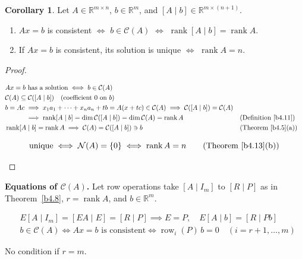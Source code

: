 \documentclass[12pt]{article}
\newcommand{\R}{\mathbb R}
\DeclareMathOperator{\rank}{rank}
\theoremstyle{definition}
\newtheorem{corollary}[theorem]{Corollary}
\newcommand{\boardtop}{\vspace*{-\abovedisplayskip}}
\DeclareMathOperator{\row}{row}
\begin{document}
\begin{corollary}\label{b4.14}
Let \(A\in\R^{m\times n}\), \(b\in\R^m\), and \([A\mid b]\in\R^{m\times(n+1)}\).
\begin{enumerate}
\item \(Ax=b\) is consistent \(\iff\) \(b\in\mathcal C(A)\) \(\iff\) \(\rank[A\mid b]=\rank A\).
\item If \(Ax=b\) is consistent, its solution is unique \(\iff\) \(\rank A=n\).
\end{enumerate}
\end{corollary}
\begin{proof}
\begin{board}[(a) \(Ax=x_1a_1+\dots+x_na_n\) (\lec{1}, \lit{Theorem~4}(b)):]
\boardtop
\begin{align*}
&Ax=b\text{ has a solution}\iff b\in\mathcal C(A)\\
&\mathcal C(A)\subseteq\mathcal C([A\mid b])\quad(\text{coefficient }0\text{ on }b)\\
&b=Ac\implies x_1a_1+\dots+x_na_n+tb=A(x+tc)\in\mathcal C(A)\implies\mathcal C([A\mid b])=\mathcal C(A)\\
&\phantom{b=Ac}\implies\rank[A\mid b]=\dim\mathcal C([A\mid b])=\dim\mathcal C(A)=\rank A&&\text{(Definition~\ref{b4.11})}\\
&\rank[A\mid b]=\rank A\implies\mathcal C(A)=\mathcal C([A\mid b])\ni b&&\text{(Theorem~\ref{b4.5}(a))}
\end{align*}
\end{board}
\begin{board}
\[
\text{unique}\iff\mathcal N(A)=\{0\}\iff\rank A=n\qquad\text{(Theorem~\ref{b4.13}(b))}
\]
\end{board}
\nopagebreak
\end{proof}

\textbf{Equations of \(\mathcal C(A)\).} Let row operations take \([A\mid I_m]\) to \([R\mid P]\) as in
Theorem~\ref{b4.8}, \(r=\rank A\), and \(b\in\R^m\).
\begin{board}[The same operations multiply on the left by \(E\) (\lec{2}, \lit{Theorem~14}(c)); \lec{1},
\lit{Theorem~4}(a); Corollary~\ref{b4.14}(a); \lec{2}, \lit{Proposition~7}(a) (consistent \(\iff\) \(z_i=0\) for \(i>r\)) with
\(z=Pb\):]
\boardtop
\begin{align*}
&E[A\mid I_m]=[EA\mid E]=[R\mid P]\implies E=P,\quad E[A\mid b]=[R\mid Pb]\\
&b\in\mathcal C(A)\iff Ax=b\text{ is consistent}\iff\row_i(P)\,b=0\quad(i=r+1,\dots,m)
\end{align*}
\end{board}
No condition if \(r=m\).
\end{document}
